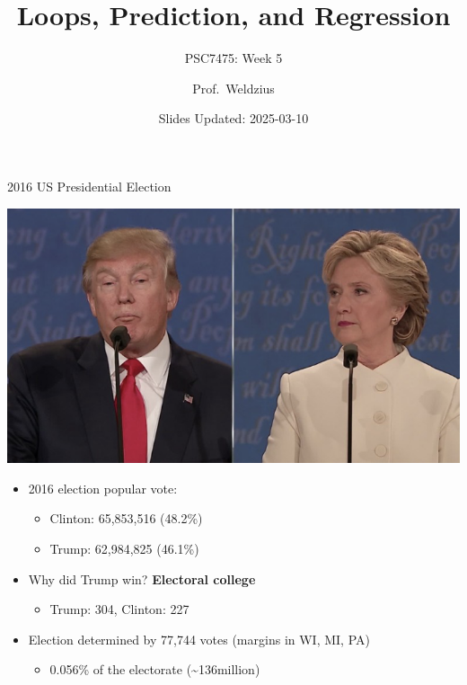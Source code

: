 \documentclass[
  ignorenonframetext,
]{beamer}
\title{Loops, Prediction, and Regression}
\subtitle{PSC7475: Week 5}
\author{Prof.~Weldzius}
\date{Slides Updated: 2025-03-10}
\institute{Villanova University}
\providecommand{\tightlist}{%
  \setlength{\itemsep}{0pt}\setlength{\parskip}{0pt}}
\begin{document}
\frame{\titlepage}

\begin{frame}{2016 US Presidential Election}
\label{us-presidential-election}
\begin{center}
  \includegraphics[width=.5\textwidth]{figs/2016election.png}
  \end{center} \pause

\begin{itemize}
\tightlist
\item
  2016 election popular vote: \pause

  \begin{itemize}
  \tightlist
  \item
    Clinton: 65,853,516 (48.2\%)
  \item
    Trump: 62,984,825 (46.1\%) \pause
  \end{itemize}
\item
  Why did Trump win? \textbf{Electoral college}

  \begin{itemize}
  \tightlist
  \item
    Trump: 304, Clinton: 227 \pause
  \end{itemize}
\item
  Election determined by 77,744 votes (margins in WI, MI, PA)

  \begin{itemize}
  \tightlist
  \item
    0.056\% of the electorate (\textasciitilde136million)
  \end{itemize}
\end{itemize}
\end{frame}
\end{document}
